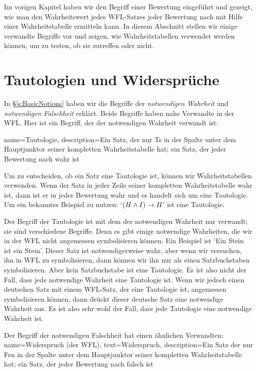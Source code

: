 Im vorigen Kapitel haben wir den Begriff einer Bewertung eingeführt und gezeigt, wie man den Wahrheitswert jedes WFL-Satzes jeder Bewertung nach mit Hilfe einer Wahrheitstabelle ermitteln kann. In diesem Abschnitt stellen wir einige verwandte Begriffe vor und zeigen, wie Wahrheitstabellen verwendet werden können, um zu testen, ob sie zutreffen oder nicht.

\section{Tautologien und Widersprüche}
In \S\ref{s:BasicNotions} haben wir die Begriffe der \emph{notwendigen Wahrheit} und \emph{notwendigen Falschheit} erklärt. Beide Begriffe haben nahe Verwandte in der WFL. Hier ist ein Begriff, der der notwendigen Wahrheit verwandt ist:

{
name=Tautologie,
description={Ein Satz, der nur Ts in der Spalte unter dem Hauptjunktor seiner kompletten Wahrheitstabelle hat; ein Satz, der jeder \gls{Bewertung} nach wahr ist}
}

Um zu entscheiden, ob ein Satz eine Tautologie ist, können wir Wahrheitstabellen verwenden. Wenn der Satz in jeder Zeile seiner kompletten Wahrheitstabelle wahr ist, dann ist er in jeder Bewertung wahr und es handelt sich um eine Tautologie. Um ein bekanntes Beispiel zu nutzen: `$(H \wedge I) \rightarrow H$' ist eine Tautologie. 

Der Begriff der Tautologie ist mit dem der notwendigen Wahrheit nur verwandt; sie sind verschiedene Begriffe. Denn es gibt einige notwendige Wahrheiten, die wir in der WFL nicht angemessen symbolisieren können. Ein Beispiel ist `Ein Stein ist ein Stein'. Dieser Satz ist notwendigerweise wahr, aber wenn wir versuchen, ihn in WFL zu symbolisieren, dann können wir ihn nur als einen Satzbuchstaben symbolisieren. Aber kein Satzbuchstabe ist eine Tautologie. Es ist also nicht der Fall, dass jede notwendige Wahrheit eine Tautologie ist. Wenn wir jedoch einen deutschen Satz mit einem WFL-Satz, der eine Tautologie ist, angemessen symbolisieren können, dann drückt dieser deutsche Satz eine notwendige Wahrheit aus. Es ist also sehr wohl der Fall, dass jede Tautologie eine notwendige Wahrheit ist.

Der Begriff der notwendigen Falschheit hat einen ähnlichen Verwandten:
{
  name=Widerspruch (der WFL),
  text=Widerspruch,
description={Ein Satz der nur Fen in der Spalte unter dem Hauptjunktor seiner kompletten Wahrheitstabelle hat; ein Satz, der jeder \gls{Bewertung} nach falsch ist}
}

